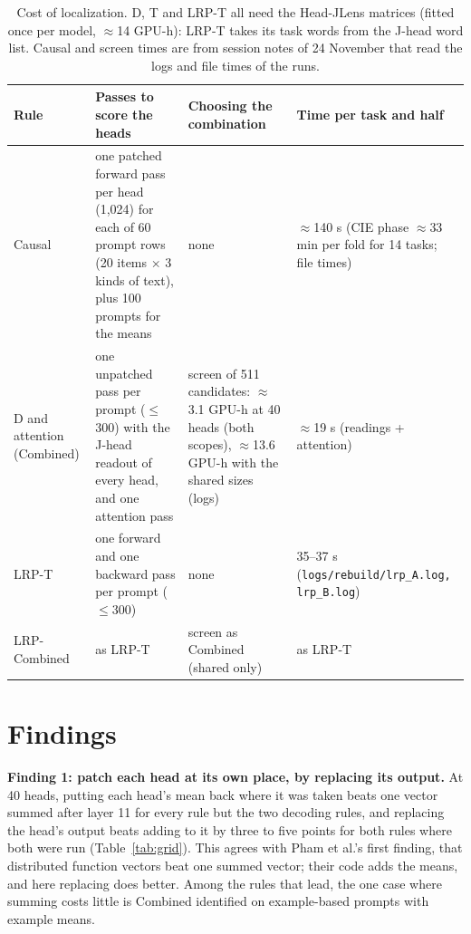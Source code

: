 \documentclass[10pt,a4paper]{article}
\newcommand{\src}[1]{{\footnotesize\textcolor{gray!60!black}{(\texttt{#1})}}}
\begin{document}
\begin{table}[htbp]
\centering\small
\begin{tabularx}{\textwidth}{@{}>{\raggedright\arraybackslash}p{2.6cm}LLL@{}}
\toprule
Rule & Passes to score the heads & Choosing the combination & Time per task and half \\
\midrule
Causal & one patched forward pass per head (1{,}024) for each of 60 prompt rows (20 items $\times$ 3 kinds of text), plus 100 prompts for the means & none & $\approx$140 s (CIE phase $\approx$33 min per fold for 14 tasks; file times) \\
D and attention (Combined) & one unpatched pass per prompt ($\leq$300) with the J-head readout of every head, and one attention pass & screen of 511 candidates: $\approx$3.1 GPU-h at 40 heads (both scopes), $\approx$13.6 GPU-h with the shared sizes (logs) & $\approx$19 s (readings + attention) \\
LRP-T & one forward and one backward pass per prompt ($\leq$300) & none & 35--37 s \src{logs/rebuild/lrp\_A.log, lrp\_B.log} \\
LRP-Combined & as LRP-T & screen as Combined (shared only) & as LRP-T \\
\bottomrule
\end{tabularx}
\caption{Cost of localization. D, T and LRP-T all need the Head-JLens matrices (fitted once per model, $\approx$14 GPU-h): LRP-T takes its task words from the J-head word list. Causal and screen times are from session notes of 24 November that read the logs and file times of the runs.}
\label{tab:cost}
\end{table}

\section{Findings}\label{sec:findings}

\textbf{Finding 1: patch each head at its own place, by replacing its output.} At 40 heads, putting each head's mean back where it was taken beats one vector summed after layer 11 for every rule but the two decoding rules, and replacing the head's output beats adding to it by three to five points for both rules where both were run (Table~\ref{tab:grid}). This agrees with Pham et al.'s first finding, that distributed function vectors beat one summed vector; their code adds the means, and here replacing does better. Among the rules that lead, the one case where summing costs little is Combined identified on example-based prompts with example means.
\end{document}
